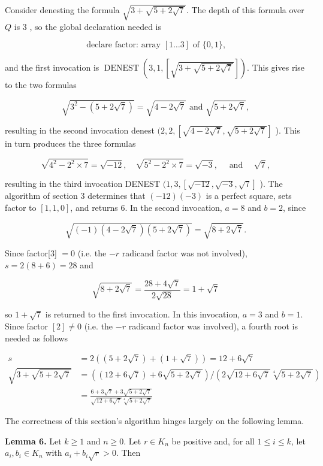 \documentclass[11pt,letterpaper]{article}
\begin{document}
Consider denesting the formula $\sqrt{3+\sqrt{5+2 \sqrt{7}}}$. The depth of this formula over $Q$ is 3 , so the global declaration needed is

\[
\text { declare factor: array }[1\ldots3] \text { of }\{0,1\} \text {, }
\]

and the first invocation is $\operatorname{DENEST}(3,1,[\sqrt{3+\sqrt{5+2 \sqrt{7}}}])$. This gives rise to the two formulas

\[
\sqrt{3^{2}-(5+2 \sqrt{7})}=\sqrt{4-2 \sqrt{7}} \text { and } \sqrt{5+2 \sqrt{7}},
\]

resulting in the second invocation denest $(2,2,[\sqrt{4-2 \sqrt{7}}, \sqrt{5+2 \sqrt{7}}]$ ). This in turn produces the three formulas

\[
\sqrt{4^{2}-2^{2} \times 7}=\sqrt{-12}, \quad \sqrt{5^{2}-2^{2} \times 7}=\sqrt{-3}, \quad \text { and } \quad \sqrt{7},
\]

resulting in the third invocation DENEST $(1,3,[\sqrt{-12}, \sqrt{-3}, \sqrt{7}]$ ). The algorithm of section 3 determines that $(-12)(-3)$ is a perfect square, sets factor to $[1,1,0]$, and returns 6. In the second invocation, $a=8$ and $b=2$, since

\[
\sqrt{(-1)(4-2 \sqrt{7})(5+2 \sqrt{7})}=\sqrt{8+2 \sqrt{7}} .
\]

Since factor[3] $=0$ (i.e. the $-r$ radicand factor was not involved), $s=2(8+6)=28$ and

\[
\sqrt{8+2 \sqrt{7}}=\frac{28+4 \sqrt{7}}{2 \sqrt{28}}=1+\sqrt{7}
\]

so $1+\sqrt{7}$ is returned to the first invocation. In this invocation, $a=3$ and $b=1$. Since factor $[2] \neq 0$ (i.e. the $-r$ radicand factor was involved), a fourth root is needed as follows

\[
\begin{aligned}
s&=2((5+2\sqrt7)+(1+\sqrt7))=12+6\sqrt7 \\
\sqrt{3+\sqrt{5+2 \sqrt{7}}} & =((12+6 \sqrt{7})+6 \sqrt{5+2 \sqrt{7}}) /(2 \sqrt{12+6 \sqrt{7}} \sqrt[4]{5+2 \sqrt{7}}) \\
& =\frac{6+3 \sqrt{7}+3 \sqrt{5+2 \sqrt{7}}}{\sqrt{12+6 \sqrt{7}} \sqrt[4]{5+2 \sqrt{7}}}
\end{aligned}
\]


The correctness of this section's algorithm hinges largely on the following lemma.

\noindent\textbf{Lemma 6.} Let $k \geqslant 1$ and $n \geqslant 0$. Let $r\in K_n$ be positive and, for all $1\leq i\leq k$, let $a_i,b_i\in K_n$ with $a_i+b_i\sqrt r>0$. Then
\end{document}
